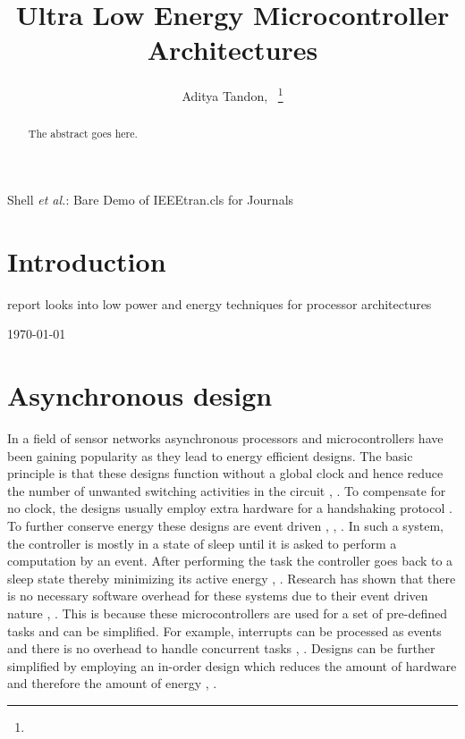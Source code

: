 \documentclass[journal]{IEEEtran}
\begin{document}
\title{Ultra Low Energy Microcontroller Architectures}
\author{Aditya Tandon,~ 
\thanks{}}
{Shell \MakeLowercase{\textit{et al.}}: Bare Demo of IEEEtran.cls for Journals}
\maketitle

\begin{abstract}
The abstract goes here.
\end{abstract}
\IEEEpeerreviewmaketitle

\section{Introduction}
 report looks into low power and energy techniques for processor architectures 
 
\hfill \today

\section{Asynchronous design}
In a field of sensor networks asynchronous processors and microcontrollers have been gaining popularity as they lead to energy efficient designs. The basic principle is that these designs function without a global clock and hence reduce the number of unwanted switching activities in the circuit \cite{SNAP/LE}, \cite{LowPower2005}. To compensate for no clock, the designs usually employ extra hardware for a handshaking protocol \cite{SNAP/LE}. To further conserve energy these designs are event driven \cite{SNAP/LE}, \cite{LowPower2005}, \cite{AVR}. In such a system, the controller is mostly in a state of sleep until it is asked to perform a computation by an event. After performing the task the controller goes back to a sleep state thereby minimizing its active energy \cite{SNAP/LE}, \cite{LowPower2005}. Research has shown that there is no necessary software overhead for these systems due to their event driven nature \cite{SNAP/LE}, \cite{LowPower2005}. This is because these microcontrollers are used for a set of pre-defined tasks and can be simplified. For example, interrupts can be processed as events and there is no overhead to handle concurrent tasks \cite{SNAP/LE}, \cite{LowPower2005}. Designs can be further simplified by employing an in-order design which reduces the amount of hardware and therefore the amount of energy \cite{LowPower2005}, \cite{SmartDust}. \\
\end{document}
